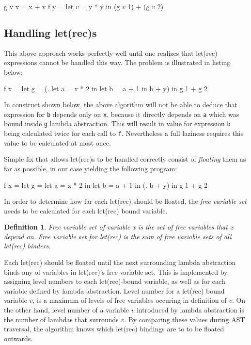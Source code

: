 \documentclass[12pt,a4paper]{report}
\newtheorem{definition}{Definition}[chapter]
\begin{document}
\vspace*{0.2in}
\begin{code}[style=haskell,mathescape=true]
g v x = x + v
f y = let $v$ = y * y
      in (g $v$ 1) + (g $v$ 2)
\end{code}

\subsection{Handling let(rec)s}
This above approach works perfectly well until one realizes that let(rec)
expressions cannot be handled this way. The problem is illustrated in listing
below:

\vspace*{0.2in}
\begin{code}[style=haskell]
f x = let g = (\y . let a = x * 2
                    in let b = a + 1
                    in b + y)
      in g 1 + g 2
\end{code}

In construct shown below, the above algorithm will not be able to deduce that
expression for \texttt{b} depends only on \texttt{x}, because it directly
depends on \texttt{a} which was bound inside \texttt{g} lambda abstraction.
This will result in value for expression \texttt{b} being calculated twice for
each call to \texttt{f}. Nevertheless a full laziness requires this value to
be calculated at most once.

Simple fix that allows let(rec)s to be handled correctly consist of
\textit{floating} them as far as possible, in our case yielding the following
program:

\vspace*{0.2in}
\begin{code}[style=haskell]
f x = let g = let a = x * 2
              in let b = a + 1
              in (\y . b + y)
      in g 1 + g 2
\end{code}

In order to determine how far each let(rec) should be floated, the \textit{free
variable set} needs to be calculated for each let(rec) bound variable.

\begin{definition}
  Free variable set of variable x is the set of free variables
  that x depend on. Free variable set for let(rec) is the sum of free
  variable sets of all let(rec) binders.
\end{definition}

Each let(rec) should be floated until the next surrounding lambda abstraction
binds any of variables in let(rec)'s free variable set. This is implemented by
assigning level numbers to each let(rec)-bound variable, as well as for each
variable defined by lambda abstraction. Level number for a let(rec) bound
variable $v$, is a maximum of levels of free variables occuring in definition
of $v$. On the other hand, level number of a variable $v$ introduced by lambda
abstraction is the number of lambdas that surrounds $v$. By comparing these
values during AST traversal, the algorithm knows which let(rec) bindings are to
to be floated outwards.
\end{document}
